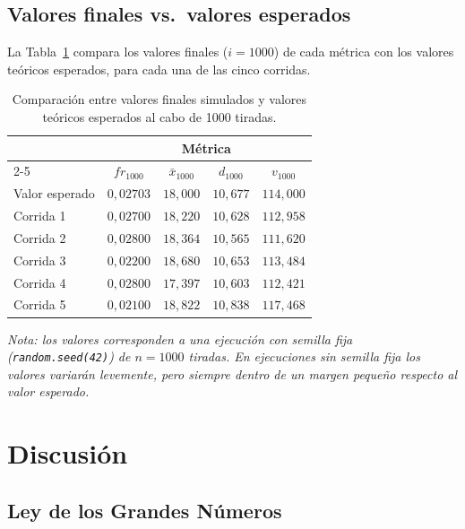 \documentclass[a4paper, 11pt]{article}
\begin{document}
\subsection{Valores finales vs.\ valores esperados}

La Tabla~\ref{tab:comparacion} compara los valores finales ($i = 1000$)
de cada métrica con los valores teóricos esperados, para cada una de las
cinco corridas.

\begin{table}[H]
  \centering
  \caption{Comparación entre valores finales simulados y valores teóricos
    esperados al cabo de 1000 tiradas.}
  \label{tab:comparacion}
  \begin{tabular}{lcccc}
    \toprule
    & \multicolumn{4}{c}{\textbf{Métrica}} \\
    \cmidrule(lr){2-5}
    & $fr_{1000}$ & $\bar{x}_{1000}$ & $d_{1000}$ & $v_{1000}$ \\
    \midrule
    Valor esperado & $0{,}02703$ & $18{,}000$ & $10{,}677$ & $114{,}000$ \\
    \midrule
    Corrida 1 & $0{,}02700$ & $18{,}220$ & $10{,}628$ & $112{,}958$ \\
    Corrida 2 & $0{,}02800$ & $18{,}364$ & $10{,}565$ & $111{,}620$ \\
    Corrida 3 & $0{,}02200$ & $18{,}680$ & $10{,}653$ & $113{,}484$ \\
    Corrida 4 & $0{,}02800$ & $17{,}397$ & $10{,}603$ & $112{,}421$ \\
    Corrida 5 & $0{,}02100$ & $18{,}822$ & $10{,}838$ & $117{,}468$ \\
    \bottomrule
  \end{tabular}
\end{table}

\textit{Nota: los valores corresponden a una ejecución con semilla fija
(\texttt{random.seed(42)}) de $n = 1000$ tiradas. En ejecuciones sin semilla
fija los valores variarán levemente, pero siempre dentro de un margen pequeño
respecto al valor esperado.}

\section{Discusión}

\subsection{Ley de los Grandes Números}
\end{document}
